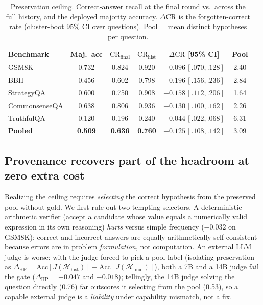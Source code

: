 \begin{table}[t]
\centering\small
\caption{Preservation ceiling. Correct-answer recall at the final round vs.\ across the full history,
and the deployed majority accuracy. $\Delta\mathrm{CR}$ is the forgotten-correct rate (cluster-boot
95\% CI over questions). Pool = mean distinct hypotheses per question.}
\label{tab:preserve}
\begin{tabular}{lccccc}
\toprule
Benchmark & Maj.\ acc & $\mathrm{CR}_{\mathrm{final}}$ & $\mathrm{CR}_{\mathrm{hist}}$ & $\Delta\mathrm{CR}$ [95\% CI] & Pool \\
\midrule
GSM8K         & 0.732 & 0.824 & 0.920 & $+0.096\,[.070,.128]$ & 2.40 \\
BBH           & 0.456 & 0.602 & 0.798 & $+0.196\,[.156,.236]$ & 2.84 \\
StrategyQA    & 0.600 & 0.750 & 0.908 & $+0.158\,[.112,.206]$ & 1.64 \\
CommonsenseQA & 0.638 & 0.806 & 0.936 & $+0.130\,[.100,.162]$ & 2.26 \\
TruthfulQA    & 0.120 & 0.196 & 0.240 & $+0.044\,[.022,.068]$ & 6.31 \\
\midrule
\textbf{Pooled} & \textbf{0.509} & \textbf{0.636} & \textbf{0.760} & $\mathbf{+0.125\,[.108,.142]}$ & 3.09 \\
\bottomrule
\end{tabular}
\end{table}

\subsection{Provenance recovers part of the headroom at zero extra cost}
\label{sec:provsel}

Realizing the ceiling requires \emph{selecting} the correct hypothesis from the preserved pool without
gold. We first rule out two tempting selectors. A deterministic arithmetic verifier (accept a candidate
whose value equals a numerically valid expression in its own reasoning) \emph{hurts} versus simple
frequency ($-0.032$ on GSM8K): correct and incorrect answers are equally arithmetically self-consistent
because errors are in problem \emph{formulation}, not computation. An external LLM judge is worse: with
the judge forced to pick a pool label (isolating preservation as
$\Delta_{\mathrm{HP}}=\mathrm{Acc}[J(\mathcal{H}_{\mathrm{hist}})]-\mathrm{Acc}[J(\mathcal{H}_{\mathrm{final}})]$),
both a 7B and a 14B judge fail the gate ($\Delta_{\mathrm{HP}}=-0.047$ and $-0.018$); tellingly, the
14B judge solving the question directly (0.76) far outscores it selecting from the pool (0.53), so a
capable external judge is a \emph{liability} under capability mismatch, not a fix.

